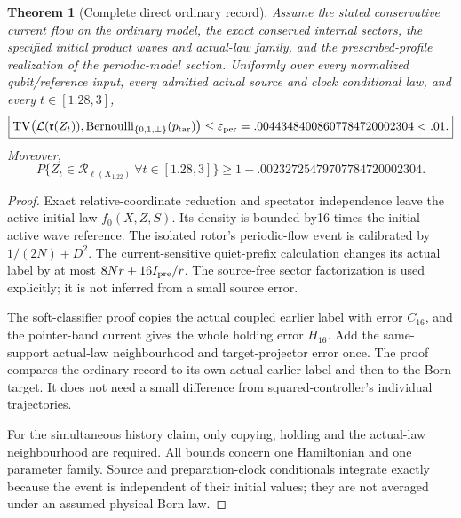 \documentclass[11pt]{article}
\newtheorem{theorem}{Theorem}[section]
\theoremstyle{definition}\newtheorem{definition}[theorem]{Definition}
\theoremstyle{remark}\newtheorem{remark}[theorem]{Remark}
\newcommand{\TV}{\operatorname{TV}}\newcommand{\Var}{\operatorname{Var}}
\begin{document}
\begin{theorem}[Complete direct ordinary record]\label{pr:thm:final}
Assume the stated conservative current flow on the ordinary model, the exact conserved internal sectors, the specified initial product waves and actual-law family, and the prescribed-profile realization of the periodic-model section. Uniformly over every normalized qubit/reference input, every admitted actual source and clock conditional law, and every $t\in[1.28,3]$,
\[
 \boxed{
 \TV\!\left(\mathcal L(\mathfrak r(Z_t)),
 \operatorname{Bernoulli}_{\{0,1,\perp\}}(p_{\rm tar})\right)
 \le\varepsilon_{\mathrm{per}}=.00443484008607784720002304<.01.}
\]
Moreover,
\[
 \boxed{
 P\{Z_t\in\mathcal R_{\ell(X_{1.22})}\ \forall t\in[1.28,3]\}
 \ge1-.00232725479707784720002304.}
\]
\end{theorem}
\begin{proof}
Exact relative-coordinate reduction and spectator independence leave the active initial law $f_0(X,Z,S)$. Its density is bounded by16 times the initial active wave reference. The isolated rotor's periodic-flow event is calibrated by $1/(2N)+D^2$. The current-sensitive quiet-prefix calculation changes its actual label by at most $8Nr+16I_{\rm pre}/r$. The source-free sector factorization is used explicitly; it is not inferred from a small source error.

The soft-classifier proof copies the actual coupled earlier label with error $C_{16}$, and the pointer-band current gives the whole holding error $H_{16}$. Add the same-support actual-law neighbourhood and target-projector error once. The proof compares the ordinary record to its own actual earlier label and then to the Born target. It does not need a small difference from squared-controller's individual trajectories.

For the simultaneous history claim, only copying, holding and the actual-law neighbourhood are required. All bounds concern one Hamiltonian and one parameter family. Source and preparation-clock conditionals integrate exactly because the event is independent of their initial values; they are not averaged under an assumed physical Born law.
\end{proof}
\end{document}
